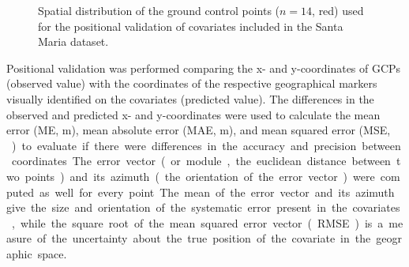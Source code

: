 \begin{figure}[!ht]
\centering
%  
%   
%   
 \caption{Spatial distribution of the ground control points ($n = 14$, red) used for the positional validation 
 of covariates included in the Santa Maria dataset.}
 \label{fig:covar-data-field-gcps}
\end{figure}

Positional validation was performed comparing the x- and y-coordinates of GCPs (observed value) with the 
coordinates of the respective geographical markers visually identified on the covariates (predicted value). 
The differences in the observed and predicted x- and y-coordinates were used to calculate the mean error (ME, 
\si{\m}), mean absolute error (MAE, \si{\m}), and mean squared error (MSE, \si{\m\square}) to evaluate if 
there were differences in the accuracy and precision between coordinates. The error vector (or module, the 
euclidean distance between two points) and its azimuth (the orientation of the error vector) were computed as 
well for every point. The mean of the error vector and its azimuth give the size and orientation of the 
systematic error present in the covariates, while the square root of the mean squared error vector (RMSE) is a 
measure of the uncertainty about the true position of the covariate in the geographic space.

